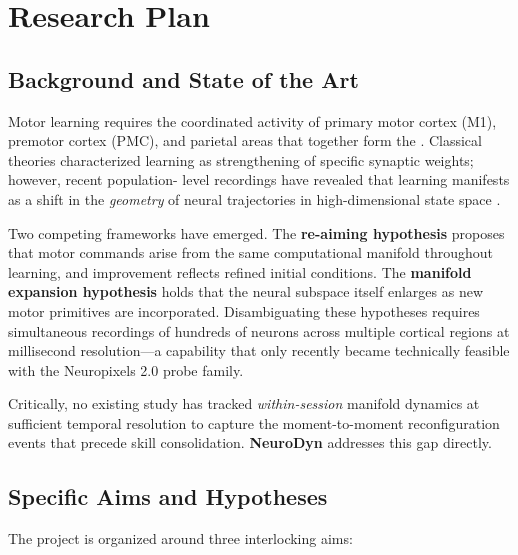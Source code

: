 \section{Research Plan}

\subsection{Background and State of the Art}

Motor learning requires the coordinated activity of primary motor cortex (M1), premotor cortex
(PMC), and parietal areas that together form the . Classical theories
characterized learning as strengthening of specific synaptic weights; however, recent population-
level recordings have revealed that learning manifests as a shift in the \textit{geometry} of
neural trajectories in high-dimensional state space \cite{shenoy2013,churchland2012}.

Two competing frameworks have emerged. The \textbf{re-aiming hypothesis} proposes that motor
commands arise from the same computational manifold throughout learning, and improvement reflects
refined initial conditions. The \textbf{manifold expansion hypothesis} holds that the neural
subspace itself enlarges as new motor primitives are incorporated. Disambiguating these
hypotheses requires simultaneous recordings of hundreds of neurons across multiple cortical
regions at millisecond resolution---a capability that only recently became technically
feasible with the Neuropixels 2.0 probe family.

Critically, no existing study has tracked \textit{within-session} manifold dynamics at
sufficient temporal resolution to capture the moment-to-moment reconfiguration events that
precede skill consolidation. \textbf{NeuroDyn} addresses this gap directly.

\subsection{Specific Aims and Hypotheses}

The project is organized around three interlocking aims:

